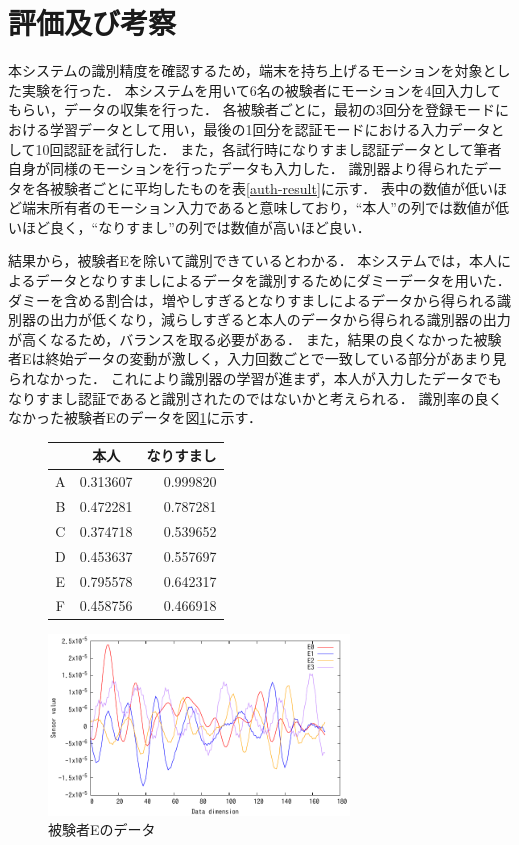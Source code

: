 \section{評価及び考察}
本システムの識別精度を確認するため，端末を持ち上げるモーションを対象とした実験を行った．
本システムを用いて6名の被験者にモーションを4回入力してもらい，データの収集を行った．
各被験者ごとに，最初の3回分を登録モードにおける学習データとして用い，最後の1回分を認証モードにおける入力データとして10回認証を試行した．
また，各試行時になりすまし認証データとして筆者自身が同様のモーションを行ったデータも入力した．
識別器より得られたデータを各被験者ごとに平均したものを表\ref{auth-result}に示す．
表中の数値が低いほど端末所有者のモーション入力であると意味しており，``本人''の列では数値が低いほど良く，``なりすまし''の列では数値が高いほど良い．

結果から，被験者Eを除いて識別できているとわかる．
本システムでは，本人によるデータとなりすましによるデータを識別するためにダミーデータを用いた．
ダミーを含める割合は，増やしすぎるとなりすましによるデータから得られる識別器の出力が低くなり，減らしすぎると本人のデータから得られる識別器の出力が高くなるため，バランスを取る必要がある．
また，結果の良くなかった被験者Eは終始データの変動が激しく，入力回数ごとで一致している部分があまり見られなかった．
これにより識別器の学習が進まず，本人が入力したデータでもなりすまし認証であると識別されたのではないかと考えられる．
識別率の良くなかった被験者Eのデータを図\ref{compare}に示す．

\begin{figure}[!tb]
  \def\@captype{table}
  \begin{minipage}{.48\textwidth}
    \centering
    \label{auth-result}
    \begin{tabular}{|c|r|r|} \hline
      \multicolumn{1}{|c|}{}  & \multicolumn{1}{c|}{本人} & \multicolumn{1}{c|}{なりすまし} \\ \hline \hline
      A & 0.313607 & 0.999820 \\ \hline
      B & 0.472281 & 0.787281 \\ \hline
      C & 0.374718 & 0.539652 \\ \hline
      D & 0.453637 & 0.557697 \\ \hline
      E & 0.795578 & 0.642317 \\ \hline
      F & 0.458756 & 0.466918 \\ \hline
    \end{tabular}
  \end{minipage}
  \hfill
  \begin{minipage}{.48\textwidth}
    \centering
    \includegraphics[bb=0 0 360 216, width=8cm]{Graphs/comp_E.pdf}
    \caption{被験者Eのデータ}
    \label{compare}
  \end{minipage}
\end{figure}

